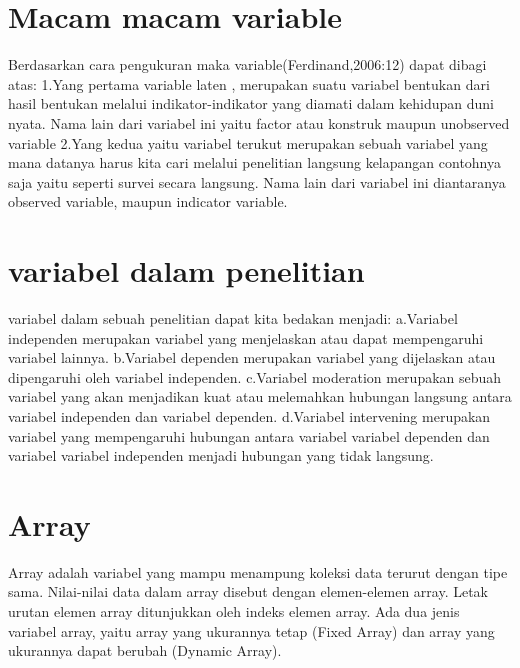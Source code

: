 \section{Macam macam variable}
Berdasarkan cara pengukuran maka variable(Ferdinand,2006:12) dapat dibagi atas:
1.Yang pertama variable laten , merupakan suatu variabel bentukan dari hasil bentukan melalui indikator-indikator yang diamati dalam 
kehidupan duni nyata. Nama lain dari variabel ini yaitu factor atau konstruk maupun unobserved variable
2.Yang kedua yaitu variabel terukut merupakan sebuah variabel yang mana datanya harus kita cari melalui penelitian langsung kelapangan 
contohnya saja yaitu seperti survei secara langsung. Nama lain dari variabel ini diantaranya observed variable, maupun indicator 
variable.

\section{variabel dalam penelitian}
variabel dalam sebuah penelitian dapat kita bedakan menjadi:
a.Variabel independen merupakan variabel yang menjelaskan atau dapat mempengaruhi variabel lainnya.
b.Variabel dependen merupakan variabel yang dijelaskan atau dipengaruhi oleh variabel independen.
c.Variabel moderation  merupakan sebuah variabel yang akan menjadikan kuat  atau melemahkan hubungan langsung antara variabel independen 
dan variabel dependen.
d.Variabel intervening merupakan variabel yang mempengaruhi hubungan antara variabel variabel dependen dan variabel variabel independen 
menjadi hubungan yang tidak langsung.

\section{Array}
Array adalah variabel yang mampu menampung koleksi data terurut dengan tipe sama. 
Nilai-nilai data dalam array disebut dengan elemen-elemen array. Letak urutan elemen array ditunjukkan oleh indeks elemen array. 
Ada dua jenis variabel array, yaitu array yang ukurannya tetap (Fixed Array) dan array yang ukurannya dapat berubah (Dynamic Array).


